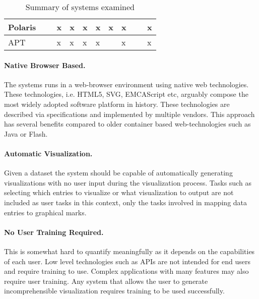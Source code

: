 \documentclass[a4paper, 11pt, titlepage, onehalfspacing]{report}
\begin{document}
\begin{sidewaystable}
\begin{tabularx}{\textwidth}{>{\centering}X|>{\centering}X|>{\centering}X|>{\centering}X|>{\centering}X|>{\centering}X|>{\centering}X|>{\centering}X|>{\centering}X|>{\centering\arraybackslash}X}
    Polaris           & ~                    & x                       & x                         & x                   & x                              & x           & x                               & ~                      & x                             \\ \hline
    APT               & ~                    & x                       & x                         & x                   & x                              & ~           & x                               & ~                      & x                             \\ 
 \end{tabularx}
\caption{Summary of systems examined}
\label{feature_matrix}
\end{sidewaystable} 
\label{project_goals}
\paragraph{Native Browser Based.} The systems runs in a web-browser environment using native web technologies. These technologies, i.e. HTML5, SVG, EMCAScript etc, arguably compose the most widely adopted software platform in history. These technologies are described via specifications and implemented by multiple vendors. This approach has several benefits compared to older container based web-technologies such as Java or Flash.

\paragraph{Automatic Visualization.} Given a dataset the system should be capable of automatically generating visualizations with no user input during the visualization process. Tasks such as selecting which entries to visualize or what visualization to output are not included as user tasks in this context, only the tasks involved in mapping data entries to graphical marks.

\paragraph{No User Training Required.}
This is somewhat hard to quantify meaningfully as it depends on the capabilities of each user. Low level technologies such as APIs are not intended for end users and require training to use. Complex applications with many features may also require user training. Any system that allows the user to generate incomprehensible visualization requires training to be used successfully.
\end{document}
